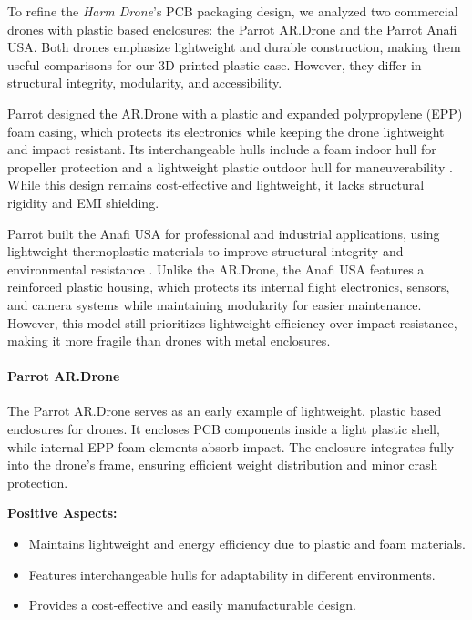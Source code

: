 \documentclass[12pt]{article}
\begin{document}
\par To refine the \textit{Harm Drone}’s PCB packaging design, we analyzed two commercial drones with plastic based enclosures: the Parrot AR.Drone and the Parrot Anafi USA. Both drones emphasize lightweight and durable construction, making them useful comparisons for our 3D-printed plastic case. However, they differ in structural integrity, modularity, and accessibility.

\par Parrot designed the AR.Drone with a plastic and expanded polypropylene (EPP) foam casing, which protects its electronics while keeping the drone lightweight and impact resistant. Its interchangeable hulls include a foam indoor hull for propeller protection and a lightweight plastic outdoor hull for maneuverability \cite{parrot2021ardrone}. While this design remains cost-effective and lightweight, it lacks structural rigidity and EMI shielding.

\par Parrot built the Anafi USA for professional and industrial applications, using lightweight thermoplastic materials to improve structural integrity and environmental resistance \cite{parrot2023anafi}. Unlike the AR.Drone, the Anafi USA features a reinforced plastic housing, which protects its internal flight electronics, sensors, and camera systems while maintaining modularity for easier maintenance. However, this model still prioritizes lightweight efficiency over impact resistance, making it more fragile than drones with metal enclosures.

\paragraph{Parrot AR.Drone}

\par The Parrot AR.Drone serves as an early example of lightweight, plastic based enclosures for drones. It encloses PCB components inside a light plastic shell, while internal EPP foam elements absorb impact. The enclosure integrates fully into the drone’s frame, ensuring efficient weight distribution and minor crash protection.

\textbf{Positive Aspects:}
\begin{itemize}
    \item Maintains lightweight and energy efficiency due to plastic and foam materials.
    \item Features interchangeable hulls for adaptability in different environments.
    \item Provides a cost-effective and easily manufacturable design.
\end{itemize}
\end{document}
